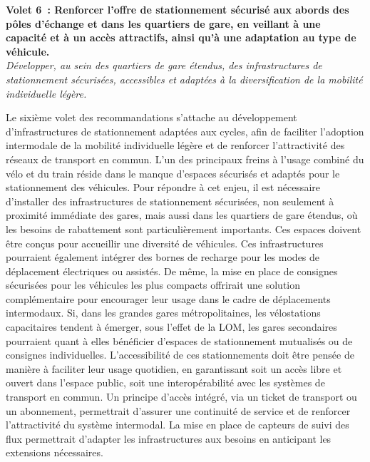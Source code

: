 \begin{refsegment}
    \begin{displayquote}
\textbf{Volet 6~: Renforcer l’offre de stationnement sécurisé aux abords des pôles d’échange et dans les quartiers de gare, en veillant à une capacité et à un accès attractifs, ainsi qu'à une adaptation au type de véhicule.}
\\
\textsl{Développer, au sein des quartiers de gare étendus, des infrastructures de stationnement sécurisées, accessibles et adaptées à la diversification de la mobilité individuelle légère.}
    \end{displayquote}
Le sixième volet des recommandations s'attache au développement d’infrastructures de stationnement adaptées aux cycles, afin de faciliter l’adoption intermodale de la mobilité individuelle légère et de renforcer l’attractivité des réseaux de transport en commun. L’un des principaux freins à l’usage combiné du vélo et du train réside dans le manque d’espaces sécurisés et adaptés pour le stationnement des véhicules. Pour répondre à cet enjeu, il est nécessaire d’installer des infrastructures de stationnement sécurisées, non seulement à proximité immédiate des gares, mais aussi dans les quartiers de gare étendus, où les besoins de rabattement sont particulièrement importants. Ces espaces doivent être conçus pour accueillir une diversité de véhicules. Ces infrastructures pourraient également intégrer des bornes de recharge pour les modes de déplacement électriques ou assistés. De même, la mise en place de consignes sécurisées pour les véhicules les plus compacts offrirait une solution complémentaire pour encourager leur usage dans le cadre de déplacements intermodaux. Si, dans les grandes gares métropolitaines, les vélostations capacitaires tendent à émerger, sous l'effet de la \acrfull{LOM}, les gares secondaires pourraient quant à elles bénéficier d'espaces de stationnement mutualisés ou de consignes individuelles. L’accessibilité de ces stationnements doit être pensée de manière à faciliter leur usage quotidien, en garantissant soit un accès libre et ouvert dans l’\gls{espace public}, soit une interopérabilité avec les systèmes de transport en commun. Un principe d’accès intégré, via un ticket de transport ou un abonnement, permettrait d’assurer une continuité de service et de renforcer l’attractivité du système intermodal. La mise en place de capteurs de suivi des flux permettrait d'adapter les infrastructures aux besoins en anticipant les extensions nécessaires.%


\end{refsegment}
